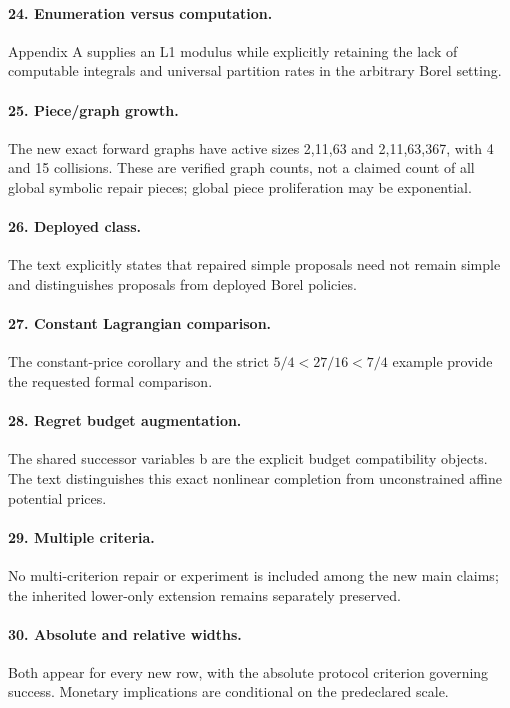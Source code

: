 \paragraph{24. Enumeration versus computation.} Appendix A supplies an L1 modulus while explicitly retaining the lack of computable integrals and universal partition rates in the arbitrary Borel setting.

\paragraph{25. Piece/graph growth.} The new exact forward graphs have active sizes 2,11,63 and 2,11,63,367, with 4 and 15 collisions. These are verified graph counts, not a claimed count of all global symbolic repair pieces; global piece proliferation may be exponential.

\paragraph{26. Deployed class.} The text explicitly states that repaired simple proposals need not remain simple and distinguishes proposals from deployed Borel policies.

\paragraph{27. Constant Lagrangian comparison.} The constant-price corollary and the strict $5/4<27/16<7/4$ example provide the requested formal comparison.

\paragraph{28. Regret budget augmentation.} The shared successor variables b are the explicit budget compatibility objects. The text distinguishes this exact nonlinear completion from unconstrained affine potential prices.

\paragraph{29. Multiple criteria.} No multi-criterion repair or experiment is included among the new main claims; the inherited lower-only extension remains separately preserved.

\paragraph{30. Absolute and relative widths.} Both appear for every new row, with the absolute protocol criterion governing success. Monetary implications are conditional on the predeclared scale.

